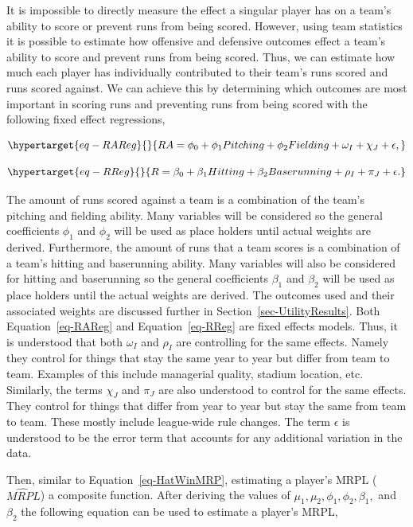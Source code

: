 \documentclass[
  12pt,
  letterpaper,
  DIV=11,
  numbers=noendperiod]{scrartcl}
\begin{document}
It is impossible to directly measure the effect a singular player has on
a team's ability to score or prevent runs from being scored. However,
using team statistics it is possible to estimate how offensive and
defensive outcomes effect a team's ability to score and prevent runs
from being scored. Thus, we can estimate how much each player has
individually contributed to their team's runs scored and runs scored
against. We can achieve this by determining which outcomes are most
important in scoring runs and preventing runs from being scored with the
following fixed effect regressions,

\begin{equation}\protect\hypertarget{eq-RAReg}{}{
RA=\phi_0+\phi_1Pitching+\phi_2Fielding+\omega_I+\chi_J+\epsilon,
}\label{eq-RAReg}\end{equation}

\begin{equation}\protect\hypertarget{eq-RReg}{}{
R=\beta_0+\beta_1Hitting+\beta_2Baserunning+\rho_I+\pi_J+\epsilon.
}\label{eq-RReg}\end{equation}

The amount of runs scored against a team is a combination of the team's
pitching and fielding ability. Many variables will be considered so the
general coefficients \(\phi_1\) and \(\phi_2\) will be used as place
holders until actual weights are derived. Furthermore, the amount of
runs that a team scores is a combination of a team's hitting and
baserunning ability. Many variables will also be considered for hitting
and baserunning so the general coefficients \(\beta_1\) and \(\beta_2\)
will be used as place holders until the actual weights are derived. The
outcomes used and their associated weights are discussed further in
Section~\ref{sec-UtilityResults}. Both Equation~\ref{eq-RAReg} and
Equation~\ref{eq-RReg} are fixed effects models. Thus, it is understood
that both \(\omega_I\) and \(\rho_I\) are controlling for the same
effects. Namely they control for things that stay the same year to year
but differ from team to team. Examples of this include managerial
quality, stadium location, etc. Similarly, the terms \(\chi_J\) and
\(\pi_J\) are also understood to control for the same effects. They
control for things that differ from year to year but stay the same from
team to team. These mostly include league-wide rule changes. The term
\(\epsilon\) is understood to be the error term that accounts for any
additional variation in the data.

Then, similar to Equation~\ref{eq-HatWinMRP}, estimating a player's MRPL
(\(\widehat{MRPL}\)) a composite function. After deriving the values of
\(\mu_1, \mu_2, \phi_1, \phi_2, \beta_1,\) and \(\beta_2\) the following
equation can be used to estimate a player's MRPL,
\end{document}
